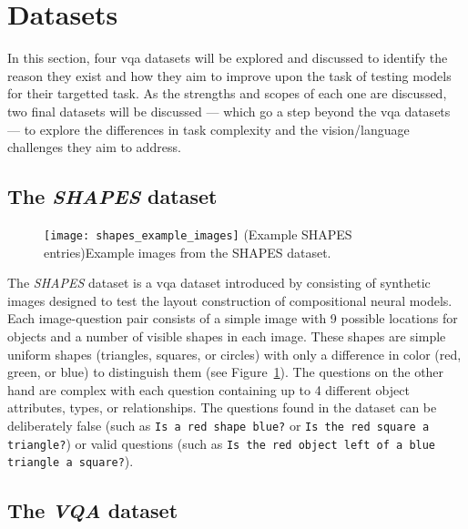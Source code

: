 \graphicspath{{content/chapters/literature_review/datasets/figures}}

\section{Datasets}
\label{sec:datasets}

In this section, four \gls{vqa} datasets will be explored and discussed to identify the reason they exist and how they aim to improve upon the task of testing models for their targetted task.
As the strengths and scopes of each one are discussed, two final datasets will be discussed --- which go a step beyond the \gls{vqa} datasets --- to explore the differences in task complexity and the vision/language challenges they aim to address.

\subsection{The \textit{SHAPES} dataset}
\label{subsec:shapes_dataset}

\begin{figure}[htbp]
    \centering
    \texttt{[image: shapes\_example\_images]}
    \captionsource(Example SHAPES entries){Example images from the SHAPES dataset. \label{fig:shapes_example_images}}{\citeauthor{andreas_neural_2016}\cite{andreas_neural_2016}}
\end{figure}

The \textit{SHAPES} dataset is a \gls{vqa} dataset introduced by \citeauthor{andreas_deep_2016} \cite{andreas_deep_2016} consisting of synthetic images designed to test the layout construction of compositional neural models.
Each image-question pair consists of a simple image with 9 possible locations for objects and a number of visible shapes in each image.
These shapes are simple uniform shapes (triangles, squares, or circles) with only a difference in color  (red, green, or blue) to distinguish them (see Figure~\ref{fig:shapes_example_images}).
The questions on the other hand are complex with each question containing up to 4 different object attributes, types, or relationships.
The questions found in the dataset can be deliberately false (such as \texttt{Is a red shape blue?} or \texttt{Is the red square a triangle?}) or valid questions (such as \texttt{Is the red object left of a blue triangle a square?}).

\subsection{The \textit{VQA} dataset}
\label{subsec:vqa_dataset}


